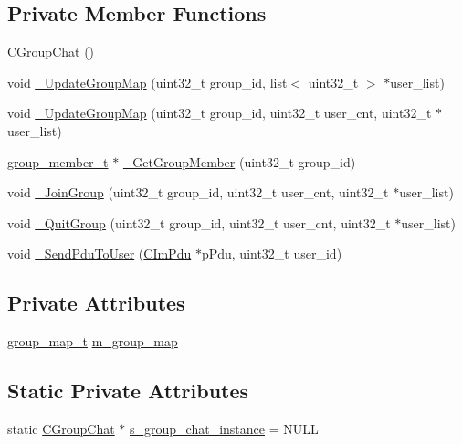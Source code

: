 \subsection*{Private Member Functions}
\begin{DoxyCompactItemize}
\item 
\hyperlink{class_c_group_chat_afaab7307ddaa37b00ac34277442d7dd7}{C\+Group\+Chat} ()
\item 
void \hyperlink{class_c_group_chat_ac464be72003de06c6895574138250a3e}{\+\_\+\+Update\+Group\+Map} (uint32\+\_\+t group\+\_\+id, list$<$ uint32\+\_\+t $>$ $\ast$user\+\_\+list)
\item 
void \hyperlink{class_c_group_chat_a87a4b928af09126c32b8ab6ca5cb60df}{\+\_\+\+Update\+Group\+Map} (uint32\+\_\+t group\+\_\+id, uint32\+\_\+t user\+\_\+cnt, uint32\+\_\+t $\ast$user\+\_\+list)
\item 
\hyperlink{_group_chat_8h_a3cbd95819457e1e021064cdf295b87dd}{group\+\_\+member\+\_\+t} $\ast$ \hyperlink{class_c_group_chat_a62985ec58f77ae07b81c5b60b0755300}{\+\_\+\+Get\+Group\+Member} (uint32\+\_\+t group\+\_\+id)
\item 
void \hyperlink{class_c_group_chat_a5adbe4e2a76bced2c6fef30a342eb3b9}{\+\_\+\+Join\+Group} (uint32\+\_\+t group\+\_\+id, uint32\+\_\+t user\+\_\+cnt, uint32\+\_\+t $\ast$user\+\_\+list)
\item 
void \hyperlink{class_c_group_chat_a15be764278dd707efaf85f8a48806f51}{\+\_\+\+Quit\+Group} (uint32\+\_\+t group\+\_\+id, uint32\+\_\+t user\+\_\+cnt, uint32\+\_\+t $\ast$user\+\_\+list)
\item 
void \hyperlink{class_c_group_chat_a138fa081dc3802c5d64ef3ef21ba0d3b}{\+\_\+\+Send\+Pdu\+To\+User} (\hyperlink{class_c_im_pdu}{C\+Im\+Pdu} $\ast$p\+Pdu, uint32\+\_\+t user\+\_\+id)
\end{DoxyCompactItemize}
\subsection*{Private Attributes}
\begin{DoxyCompactItemize}
\item 
\hyperlink{_group_chat_8h_a81a9d70a4e9621ca0473e9e60e171f45}{group\+\_\+map\+\_\+t} \hyperlink{class_c_group_chat_aaf58545f7641af48cdbc36f68521aefb}{m\+\_\+group\+\_\+map}
\end{DoxyCompactItemize}
\subsection*{Static Private Attributes}
\begin{DoxyCompactItemize}
\item 
static \hyperlink{class_c_group_chat}{C\+Group\+Chat} $\ast$ \hyperlink{class_c_group_chat_a32fd8d5da425d8b8da7a4e91127574ce}{s\+\_\+group\+\_\+chat\+\_\+instance} = N\+U\+L\+L
\end{DoxyCompactItemize}


